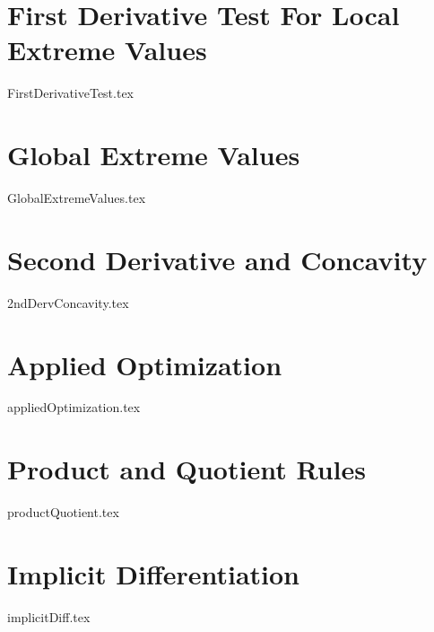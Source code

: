 \documentclass[11pt,a4paper,oneside]{book}
\theoremstyle{definition}%
\begin{document}
\chapter{First Derivative Test For Local Extreme Values}\label{FirstDerv}
{FirstDerivativeTest.tex}

\chapter{Global Extreme Values}\label{GlobalExtreme}
{GlobalExtremeValues.tex}

\chapter{Second Derivative and Concavity}\label{concavity}
{2ndDervConcavity.tex}



\chapter{Applied Optimization}\label{appliedOptimization}
{appliedOptimization.tex}


\chapter{Product and Quotient Rules}\label{productQuotient}
{productQuotient.tex}

\chapter{Implicit Differentiation}\label{implicitDiff}
{implicitDiff.tex}
\end{document}
